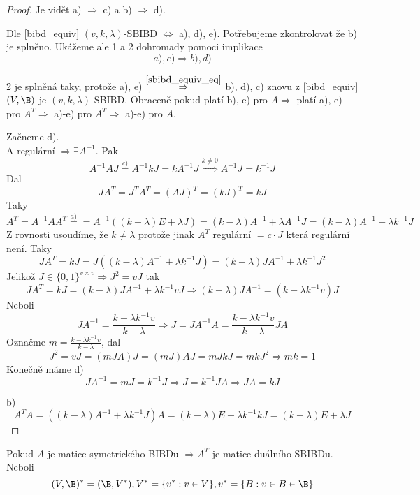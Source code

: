 \begin{proof}
	Je vidět a) $\Rightarrow$ c) a b) $\Rightarrow$ d).

	Dle \cref{bibd_equiv} $(v, k, \lambda)$-SBIBD $\iff$ a), d), e).
	Potřebujeme zkontrolovat že b) je splněno.
	Ukážeme ale 1 a 2 dohromady pomoci implikace
	\begin{equation}\label{sbibd_equiv_eq}
		a), e) \Rightarrow b), d)
	\end{equation}

	2 je splněná taky, protože a), e) $\stackrel{\cref{sbibd_equiv_eq}}{\Rightarrow}$ b), d), c) znovu z \cref{bibd_equiv} $(V, \B)$ je $(v, k, \lambda)$-SBIBD.
	Obraceně pokud platí b), e) pro $A \Rightarrow$ platí a), e) pro $A^T \Rightarrow$ a)-e) pro $A^T \Rightarrow$ a)-e) pro $A$.

	Začneme d).\\
	A regulární $\Rightarrow \exists A^{-1}$.
	Pak
	\[ A^{-1}AJ \stackrel{c)}{=} A^{-1}kJ = k A^{-1} J \stackrel{k \ne 0}{\Rightarrow} A^{-1}J = k^{-1} J \]
	Dal
	\[ JA^T = J^TA^T = (AJ)^T = (kJ)^T = k J \]
	Taky
	\[ A^T = A^{-1}AA^T \stackrel{a)}{=} = A^{-1}((k - \lambda)E + \lambda J) = (k - \lambda)A^{-1} + \lambda A^{-1}J = (k - \lambda)A^{-1} + \lambda k^{-1}J \]
	Z rovnosti usoudíme, že $k \ne \lambda$ protože jinak $A^T$ regulární $=c \cdot J$ která regulární není.
	Taky
	\[ JA^T = kJ = J ((k - \lambda)A^{-1} + \lambda k^{-1}J) = (k - \lambda)JA^{-1} + \lambda k^{-1}J^2 \]
	Jelikož $J \in \{ 0, 1 \}^{v \times v} \Rightarrow J^2 = vJ$ tak
	\[ JA^T = kJ = (k - \lambda)JA^{-1} + \lambda k^{-1} v J \Rightarrow (k - \lambda)JA^{-1} = (k - \lambda k^{-1} v)J \]
	Neboli
	\[ JA^{-1} = \frac{k - \lambda k^{-1} v}{k - \lambda} \Rightarrow J = JA^{-1}A = \frac{k - \lambda k^{-1} v}{k - \lambda}JA \]
	Označme $m = \frac{k - \lambda k^{-1} v}{k - \lambda}$, dal
	\[ J^2 = vJ = (mJA)J = (mJ) AJ = mJ kJ = mkJ^2 \Rightarrow mk = 1 \]
	Konečně máme d)
	\[ JA^{-1} = mJ = k^{-1}J \Rightarrow J = k^{-1}JA \Rightarrow JA = kJ \]

	b)
	\[ A^TA = ((k - \lambda)A^{-1} + \lambda k^{-1}J)A = (k - \lambda)E + \lambda k^{-1} k J = (k - \lambda)E + \lambda J \]
\end{proof}

\begin{consequence}
	Pokud $A$ je matice symetrického BIBDu $\Rightarrow A^T$ je matice duálního SBIBDu.
	Neboli
	\[ (V, \B)^{\ast} = (\B, V^{\ast}), V^{\ast} = \{ v^{\ast}: v \in V\}, v^{\ast} = \{ B: v \in B \in \B \} \]
\end{consequence}

